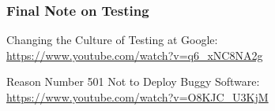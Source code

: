 \begin{frame}
\frametitle{Final Note on Testing}
\begin{changemargin}{1cm}

Changing the Culture of Testing at Google:\\
\url{https://www.youtube.com/watch?v=q6\_xNC8NA2g}

Reason Number 501 Not to Deploy Buggy Software:\\
\url{https://www.youtube.com/watch?v=O8KJC\_U3KjM}

\end{changemargin}
\end{frame}


